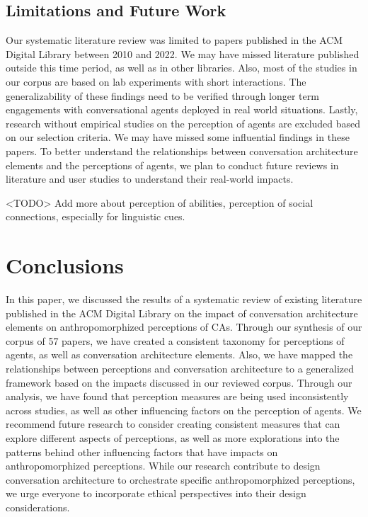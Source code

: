 \documentclass[sigconf,screen,review, anonymous]{acmart}
\begin{document}
\subsection{Limitations and Future Work}

Our systematic literature review was limited to papers published in the ACM Digital Library between 2010 and 2022. We may have missed literature published outside this time period, as well as in other libraries. Also, most of the studies in our corpus are based on lab experiments with short interactions. The generalizability of these findings need to be verified through longer term engagements with conversational agents deployed in real world situations. Lastly, research without empirical studies on the perception of agents are excluded based on our selection criteria. We may have missed some influential findings in these papers. To better understand the relationships between conversation architecture elements and the perceptions of agents, we plan to conduct future reviews in literature and user studies to understand their real-world impacts.

<TODO> Add more about perception of abilities, perception of social connections, especially for linguistic cues.


\section{Conclusions}

In this paper, we discussed the results of a systematic review of existing literature published in the ACM Digital Library on the impact of conversation architecture elements on anthropomorphized perceptions of CAs.  Through our synthesis of our corpus of 57 papers, we have created a consistent taxonomy for perceptions of agents, as well as conversation architecture elements. Also, we have mapped the relationships between perceptions and conversation architecture to a generalized framework based on the impacts discussed in our reviewed corpus. Through our analysis, we have found that perception measures are being used inconsistently across studies, as well as other influencing factors on the perception of agents. We recommend future research to consider creating consistent measures that can explore different aspects of perceptions, as well as more explorations into the patterns behind other influencing factors that have impacts on anthropomorphized perceptions. While our research contribute to design conversation architecture to orchestrate specific anthropomorphized perceptions, we urge everyone to incorporate ethical perspectives into their design considerations.
\end{document}
